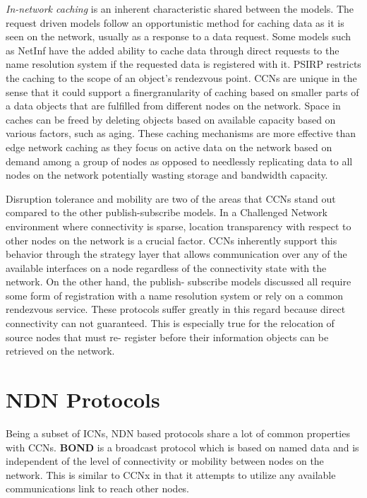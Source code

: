 \documentclass[a4paper,12pt]{report}      %
\begin{document}
\emph{In-network caching} is an inherent characteristic shared between the models. The request driven models
follow an opportunistic method for caching data as it is seen on the network, usually as a response to a
data request. Some models such as NetInf have the added ability to cache data through direct requests
to the name resolution system if the requested data is registered with it. PSIRP restricts the caching to
the scope of an object's rendezvous point. CCNs are unique in the sense that it could support a finergranularity of caching based on smaller parts of a data objects that are fulfilled from different nodes on
the network. Space in caches can be freed by deleting objects based on available capacity based on
various factors, such as aging. These caching mechanisms are more effective than edge network
caching as they focus on active data on the network based on demand among a group of nodes as
opposed to needlessly replicating data to all nodes on the network potentially wasting storage and
bandwidth capacity.

Disruption tolerance and mobility are two of the areas that CCNs stand out compared to the other
publish-subscribe models. In a Challenged Network environment where connectivity is sparse, location
transparency with respect to other nodes on the network is a crucial factor. CCNs inherently support
this behavior through the strategy layer that allows communication over any of the available interfaces
on a node regardless of the connectivity state with the network. On the other hand, the publish-
subscribe models discussed all require some form of registration with a name resolution system or rely
on a common rendezvous service. These protocols suffer greatly in this regard because direct
connectivity can not guaranteed. This is especially true for the relocation of source nodes that must re-
register before their information objects can be retrieved on the network.\cite{dirk2941}

\section{NDN Protocols}

Being a subset of ICNs, NDN based protocols share a lot of common properties with CCNs.
\textbf{BOND} \cite{bond} is a broadcast protocol which is based on named data and is independent of the
level of connectivity or mobility between nodes on the network. This is similar to CCNx in that it
attempts to utilize any available communications link to reach other nodes.
\end{document}

